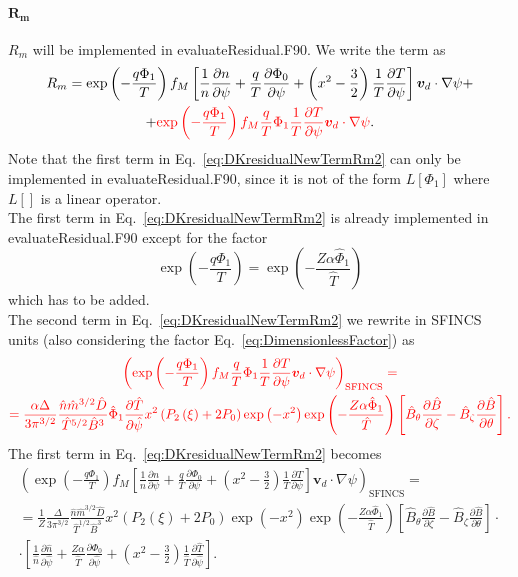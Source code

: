 \documentclass[12pt]{article}
\newcommand{\p}{\partial}
\newcommand{\na}{\nabla}
\begin{document}
\paragraph*{$\bm{R_m}$}
$R_m$ will be implemented in evaluateResidual.F90. We write the term as 
\begin{multline}
R_m = \exp \left(- \frac{q \Phi_1}{T}  \right) f_{M} \left[\frac{1}{n} \frac{\p n}{\p \psi} + \frac{q}{T} \frac{\p \Phi_0}{\p \psi} + \left(x^2 - \frac{3}{2}\right) \frac{1}{T} \frac{\p T}{\p \psi}\right] \bm{v}_d \cdot \na \psi + \\ +  \textcolor{red}{
  \exp \left(- \frac{q \Phi_1}{T}  \right) f_{M} \frac{q}{T} \Phi_1 \frac{1}{T} \frac{\p T}{\p \psi} \bm{v}_d \cdot \na \psi }.
\label{eq:DKresidualNewTermRm2}
\end{multline}
Note that the first term in Eq.~\ref{eq:DKresidualNewTermRm2} can only be implemented in evaluateResidual.F90, since it is not of the form $L\left[\Phi_1\right]$ where $L\left[\right]$ is a linear operator.\\
The first term in Eq.~\ref{eq:DKresidualNewTermRm2} is already implemented in evaluateResidual.F90 except for the factor 
\[
\exp \left(- \frac{q \Phi_1}{T}  \right) = \exp \left(- \frac{Z \alpha \hat{\Phi}_1}{\hat{T}}  \right)
\]
which has to be added.\\
The second term in Eq.~\ref{eq:DKresidualNewTermRm2} we rewrite in SFINCS units (also considering the factor Eq.~\ref{eq:DimensionlessFactor}) as
\begin{multline}
\textcolor{red}{
\left(\exp \left(- \frac{q \Phi_1}{T}  \right) f_{M} \frac{q}{T} \Phi_1 \frac{1}{T} \frac{\p T}{\p \psi} \bm{v}_d \cdot \na \psi\right)_{\mathrm{SFINCS}} = } \\ \textcolor{red}{ =
\frac{\alpha \Delta}{3 \pi^{3/2}} \frac{\hat{n} \hat{m}^{3/2} \hat{D}}{\hat{T}^{5/2} \hat{B}^3 } \hat{\Phi}_1 \frac{\p \hat{T}}{\p \hat{\psi}}
x^2 \left(P_2\left(\xi\right) + 2 P_0\right)
\exp\left(-x^2\right) \exp \left(- \frac{Z \alpha \hat{\Phi}_1}{\hat{T}}\right) \left[\hat{B}_{\theta} \frac{\p \hat{B}}{\p \zeta} - \hat{B}_{\zeta} \frac{\p \hat{B}}{\p \theta}\right]. 
}
\label{eq:Rmterm2}
\end{multline}
The first term in Eq.~\ref{eq:DKresidualNewTermRm2} becomes
\begin{multline}
\left(\exp \left(- \frac{q \Phi_1}{T}  \right) f_{M} \left[\frac{1}{n} \frac{\p n}{\p \psi} + \frac{q}{T} \frac{\p \Phi_0}{\p \psi} + \left(x^2 - \frac{3}{2}\right) \frac{1}{T} \frac{\p T}{\p \psi}\right] \bm{v}_d \cdot \na \psi \right)_{\mathrm{SFINCS}} = \\ = \frac{1}{Z}
\frac{\Delta}{3 \pi^{3/2}} \frac{\hat{n} \hat{m}^{3/2} \hat{D}}{\hat{T}^{1/2} \hat{B}^3 }
x^2 \left(P_2\left(\xi\right) + 2 P_0\right)
\exp\left(-x^2\right) \exp \left(- \frac{Z \alpha \hat{\Phi}_1}{\hat{T}}\right) \left[\hat{B}_{\theta} \frac{\p \hat{B}}{\p \zeta} - \hat{B}_{\zeta} \frac{\p \hat{B}}{\p \theta}\right] \cdot \\ \cdot
\left[\frac{1}{\hat{n}} \frac{\p \hat{n}}{\p \hat{\psi}} + \frac{Z \alpha}{\hat{T}} \frac{\p \hat{\Phi}_0}{\p \hat{\psi}} + \left(x^2 - \frac{3}{2}\right) \frac{1}{\hat{T}} \frac{\p \hat{T}}{\p \hat{\psi}}\right].
\label{eq:Rmterm1}
\end{multline}
\end{document}
